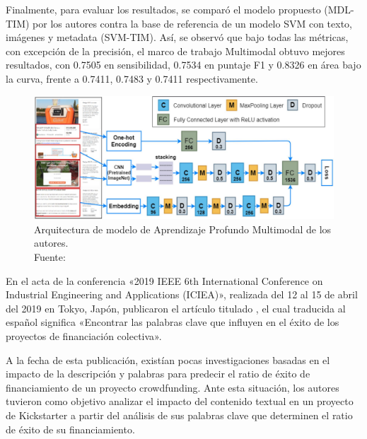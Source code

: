 Finalmente, para evaluar los resultados, se comparó el modelo propuesto (MDL-TIM) por los autores contra la base de referencia de un modelo SVM con texto, imágenes y metadata (SVM-TIM). Así, se observó que bajo todas las métricas, con excepción de la precisión, el marco de trabajo Multimodal obtuvo mejores resultados, con 0.7505 en sensibilidad, 0.7534 en puntaje F1 y 0.8326 en área bajo la curva, frente a 0.7411, 0.7483 y 0.7411 respectivamente.

\begin{figure}[!ht]
	\begin{center}
		\includegraphics[width=1\textwidth]{2/figures/cheng2019.jpg}
		\caption[Arquitectura de modelo de Aprendizaje Profundo Multimodal de los autores]{Arquitectura de modelo de Aprendizaje Profundo Multimodal de los autores.\\
			Fuente: \cite{pr_cheng2019deeplearning}}
		\label{2:fig125}
	\end{center}
\end{figure}

En el acta de la conferencia «2019 IEEE 6th International Conference on Industrial Engineering and Applications (ICIEA)», realizada del 12 al 15 de abril del 2019 en Tokyo, Japón, \cite{pr_chen2019keywords_crowdfunding} publicaron el artículo titulado , el cual traducida al español significa «Encontrar las palabras clave que influyen en el éxito de los proyectos de financiación colectiva».

A la fecha de esta publicación, existían pocas investigaciones basadas en el impacto de la descripción y palabras para predecir el ratio de éxito de financiamiento de un proyecto crowdfunding. Ante esta situación, los autores tuvieron como objetivo analizar el impacto del contenido textual en un proyecto de Kickstarter a partir del análisis de sus palabras clave que determinen el ratio de éxito de su financiamiento.

